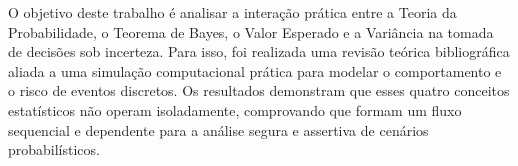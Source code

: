     \begin{resumo}
        O objetivo deste trabalho é analisar a interação prática entre a Teoria
        da Probabilidade, o Teorema de Bayes, o Valor Esperado e a Variância na
        tomada de decisões sob incerteza. Para isso, foi realizada uma revisão
        teórica bibliográfica aliada a uma simulação computacional prática para
        modelar o comportamento e o risco de eventos discretos. Os resultados
        demonstram que esses quatro conceitos estatísticos não operam
        isoladamente, comprovando que formam um fluxo sequencial e dependente
        para a análise segura e assertiva de cenários probabilísticos.
    \end{resumo}
